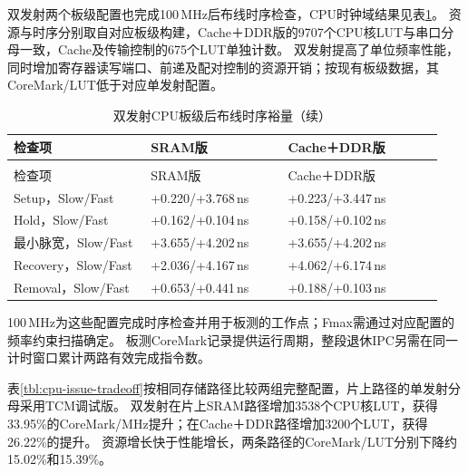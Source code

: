 双发射两个板级配置也完成100\,MHz后布线时序检查，CPU时钟域结果见表\ref{tbl:cpu-dual-board-timing}。
资源与时序分别取自对应板级构建，Cache＋DDR版的9707个CPU核LUT与串口分母一致，Cache及传输控制的675个LUT单独计数。
双发射提高了单位频率性能，同时增加寄存器读写端口、前递及配对控制的资源开销；按现有板级数据，其CoreMark/LUT低于对应单发射配置。

\begin{reporttable}
\begin{longtable}{@{}p{0.30\linewidth}p{0.30\linewidth}p{0.34\linewidth}@{}}
\caption{双发射CPU板级后布线时序裕量}\label{tbl:cpu-dual-board-timing}\\
\toprule
检查项 & SRAM版 & Cache＋DDR版 \\
\midrule
\endfirsthead
\caption[]{双发射CPU板级后布线时序裕量（续）}\\
\toprule
检查项 & SRAM版 & Cache＋DDR版 \\
\midrule
\endhead
\bottomrule
\endfoot
Setup，Slow/Fast & +0.220/+3.768\,ns & +0.223/+3.447\,ns \\
Hold，Slow/Fast & +0.162/+0.104\,ns & +0.158/+0.102\,ns \\
最小脉宽，Slow/Fast & +3.655/+4.202\,ns & +3.655/+4.202\,ns \\
Recovery，Slow/Fast & +2.036/+4.167\,ns & +4.062/+6.174\,ns \\
Removal，Slow/Fast & +0.653/+0.441\,ns & +0.188/+0.103\,ns \\
\end{longtable}
\end{reporttable}

100\,MHz为这些配置完成时序检查并用于板测的工作点；Fmax需通过对应配置的频率约束扫描确定。
板测CoreMark记录提供运行周期，整段退休IPC另需在同一计时窗口累计两路有效完成指令数。

表\ref{tbl:cpu-issue-tradeoff}按相同存储路径比较两组完整配置，片上路径的单发射分母采用TCM调试版。
双发射在片上SRAM路径增加3538个CPU核LUT，获得33.95\%的CoreMark/MHz提升；在Cache＋DDR路径增加3200个LUT，获得26.22\%的提升。
资源增长快于性能增长，两条路径的CoreMark/LUT分别下降约15.02\%和15.39\%。

